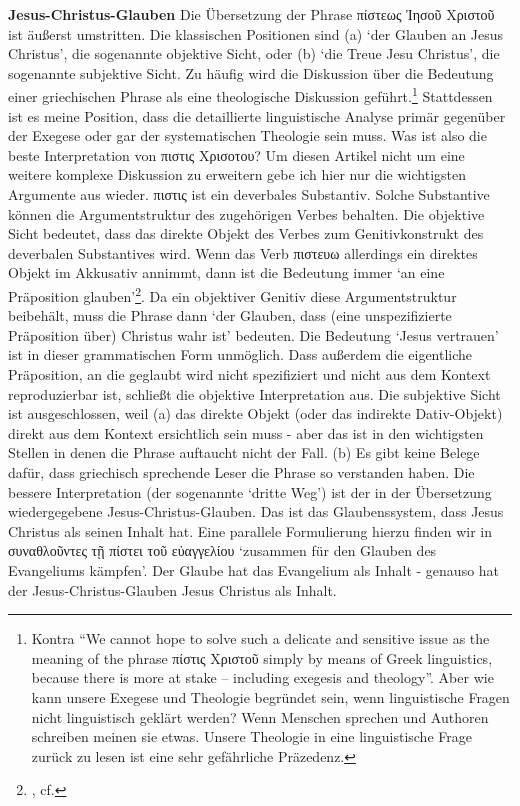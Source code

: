 \textbf{Jesus-Christus-Glauben} Die Übersetzung der Phrase πίστεως Ἰησοῦ Χριστοῦ ist äußerst umstritten.
		Die klassischen Positionen sind (a) `der Glauben an Jesus Christus', die sogenannte objektive Sicht, oder (b) `die Treue Jesu Christus', die sogenannte subjektive Sicht.
		Zu häufig wird die Diskussion über die Bedeutung einer griechischen Phrase als eine theologische Diskussion geführt.\footnote{
			Kontra \Cite[53]{porter-pitts} ``We cannot hope to solve such a delicate and sensitive issue as the meaning of the phrase πίστις Χριστοῦ simply by means of Greek linguistics,
			because there is more at stake – including exegesis and theology''.
			Aber wie kann unsere Exegese und Theologie begründet sein, wenn linguistische Fragen nicht linguistisch geklärt werden?
			Wenn Menschen sprechen und Authoren schreiben meinen sie etwas.
			Unsere Theologie in eine linguistische Frage zurück zu lesen ist eine sehr gefährliche Präzedenz.
		}
		Stattdessen ist es meine Position, dass die detaillierte linguistische Analyse primär gegenüber der Exegese oder gar der systematischen Theologie sein muss.
		Was ist also die beste Interpretation von πιστις Χρισοτου?
		Um diesen Artikel nicht um eine weitere komplexe Diskussion zu erweitern gebe ich hier nur die wichtigsten Argumente aus
		\Cite{grasso-pistis-christou} wieder.
		πιστις ist ein deverbales Substantiv. Solche Substantive können die Argumentstruktur des zugehörigen Verbes behalten.
		Die objektive Sicht bedeutet, dass das direkte Objekt des Verbes zum Genitivkonstrukt des deverbalen Substantives wird.
		Wenn das Verb πιστευω allerdings ein direktes Objekt im Akkusativ annimmt, dann ist die Bedeutung immer `an eine Präposition glauben'\footnote{
			\Cite[4.1.1]{grasso-pistis-christou}, cf. 
		}.
		Da ein objektiver Genitiv diese Argumentstruktur beibehält, muss die Phrase dann `der Glauben, dass (eine unspezifizierte Präposition über) Christus wahr ist' bedeuten.
		Die Bedeutung `Jesus vertrauen' ist in dieser grammatischen Form unmöglich.
		Dass außerdem die eigentliche Präposition, an die geglaubt wird nicht spezifiziert und nicht aus dem Kontext reproduzierbar ist, schließt die objektive Interpretation aus.
		Die subjektive Sicht ist ausgeschlossen, weil (a) das direkte Objekt (oder das indirekte Dativ-Objekt) direkt aus dem Kontext ersichtlich sein muss -
		aber das ist in den wichtigsten Stellen in denen die Phrase auftaucht nicht der Fall.
		(b) Es gibt keine Belege dafür, dass griechisch sprechende Leser die Phrase so verstanden haben.
		Die bessere Interpretation (der sogenannte `dritte Weg') ist der in der Übersetzung wiedergegebene Jesus-Christus-Glauben.
		Das ist das Glaubenssystem, dass Jesus Christus als seinen Inhalt hat.
		Eine parallele Formulierung hierzu finden wir in  συναθλοῦντες τῇ πίστει τοῦ εὐαγγελίου `zusammen für den Glauben des Evangeliums kämpfen'.
		Der Glaube hat das Evangelium als Inhalt - genauso hat der Jesus-Christus-Glauben Jesus Christus als Inhalt.

